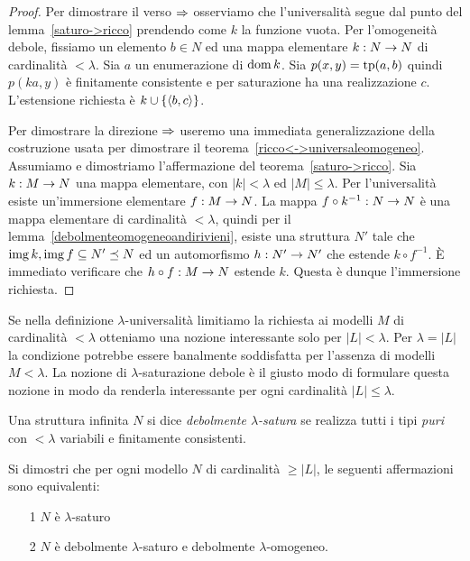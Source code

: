\begin{proof} 
Per dimostrare il verso $\Rightarrow$ osserviamo che l'universalit\`a segue dal punto  del lemma~\ref{saturo->ricco} prendendo come $k$ la funzione vuota. Per l'omogeneit\`a debole, fissiamo un elemento $b\in N$ ed una mappa elementare $k:N\rightarrow N$ di cardinalit\`a $<\lambda$. Sia $a$ un enumerazione di $\mathop{\rm dom} k$. Sia $p(x,y)=\textrm{tp}(a,b)$ quindi $p(ka,y)$ \`e finitamente consistente e per saturazione ha una realizzazione $c$. L'estensione richiesta \`e $k\cup\{\langle b,c\rangle\}$.

Per dimostrare la direzione $\Rightarrow$ useremo una immediata generalizzazione della costruzione usata per dimostrare il teorema~\ref{ricco<->universaleomogeneo}. Assumiamo  e dimostriamo l'affermazione  del teorema~\ref{saturo->ricco}. Sia $k:M\rightarrow N$ una mappa elementare, con $|k|<\lambda$ ed $|M|\le\lambda$. Per l'universalit\`a esiste un'immersione  elementare $f:M\rightarrow N$. La mappa $f\circ k^{-1}:N\rightarrow N$ \`e una mappa elementare di cardinalit\`a $<\lambda$, quindi per il lemma~\ref{debolmenteomogeneoandirivieni}, esiste una struttura $N'$ tale che $\mathop{\rm img} k,\mathop{\rm img} f\subseteq N'\preceq N$ ed un  automorfismo $h:N'\rightarrow N'$ che estende $k\circ f^{-1}$. \`E immediato verificare che $h\circ f:M\rightarrow N$ estende $k$. Questa \`e dunque l'immersione richiesta.
\end{proof}

Se nella definizione $\lambda$-universalit\`a limitiamo la richiesta ai modelli $M$ di cardinalit\`a $<\lambda$ otteniamo una nozione interessante solo per $|L|<\lambda$. Per $\lambda=|L|$ la condizione potrebbe essere banalmente soddisfatta per l'assenza di modelli $M<\lambda$. La nozione di $\lambda$-saturazione debole \`e il giusto modo di formulare questa nozione in modo da renderla interessante per ogni cardinalit\`a  $|L|\le\lambda$.

Una struttura infinita $N$ si dice \emph{debolmente $\lambda$-satura\/} se realizza tutti i tipi \textit{puri} con $<\lambda$ variabili e finitamente consistenti. 

\begin{exercise}\label{saturazione debole}
Si dimostri che per ogni modello $N$ di cardinalit\`a $\ge |L|$, le seguenti affermazioni sono equivalenti:
\begin{itemize}
\item[1] $N$ \`e $\lambda$-saturo
\item[2] $N$ \`e debolmente $\lambda$-saturo e debolmente $\lambda$-omogeneo.\QED 
\end{itemize}
\end{exercise}

